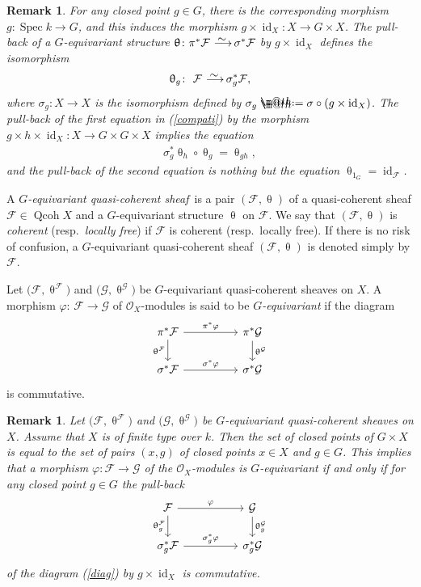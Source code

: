 \documentclass[11pt]{article}
\makeatletter
\numberwithin{equation}{section}
\newtheorem{rem}[dfn]{Remark}
\newcommand*{\defeq}{\mathrel{\rlap{%
 \raisebox{0.3ex}{$\m@th\cdot$}}%
 \raisebox{-0.3ex}{$\m@th\cdot$}}%
 =}
\numberwithin{equation}{section}
\newcommand{\Spec}{\operatorname{Spec}}
\newcommand{\Qcoh}{\operatorname{Qcoh}}
\newcommand{\id}{\operatorname{id}}
\newcommand{\cF}{\mathcal{F}}
\newcommand{\cG}{\mathcal{G}}
\newcommand{\cO}{\mathcal{O}}
\newcommand{\simto}{\,\,\,\,\raisebox{4pt}{$\sim$}{\kern -1.1em \longrightarrow}\,}
\makeatother
\begin{document}
\begin{rem}\label{closed point isom}
For any closed point $g\in G$, there is the corresponding morphism $g\colon \Spec k\to G$, and this induces the morphism $g\times\id_X\colon X\to G\times X$. The pull-back of a $G$-equivariant structure $\uptheta\colon \pi^*\cF\simto \sigma^*\cF$ by $g\times \id_X$ defines the isomorphism
\begin{gather*}
\uptheta_g\colon\ \cF\simto \sigma_g^*\cF,
\end{gather*}
where $\sigma_g\colon X\to X$ is the isomorphism defined by $\sigma_g\defeq \sigma\circ (g\times \id_X)$. The pull-back of the first equation in (\ref{compati}) by the morphism $ g\times h\times\id_X\colon X\to G\times G\times X$ implies the equation
\begin{gather*}
\sigma_g^*\uptheta_h\circ \uptheta_g=\uptheta_{gh},
\end{gather*}
and the pull-back of the second equation is nothing but the equation $\uptheta_{1_G}=\id_{\cF}$.
\end{rem}

A {\it $G$-equivariant quasi-coherent sheaf} \,is a pair $(\cF, \uptheta)$ of a quasi-coherent sheaf $\cF\in\Qcoh X$ and a $G$-equivariant structure $\uptheta$ on $\cF$. We say that $(\cF,\uptheta)$ is {\it coherent} (resp.\ {\it locally free}) if $\cF$ is coherent (resp.\ locally free). If there is no risk of confusion, a $G$-equivariant quasi-coherent sheaf $(\cF, \uptheta)$ is denoted simply by $\cF$.

Let $\big(\cF,\uptheta^{\cF}\big)$ and $\big(\cG,\uptheta^{\cG}\big)$ be $G$-equivariant quasi-coherent sheaves on $X$. A morphism $\varphi$: $\cF\to \cG$ of $\cO_X$-modules is said to be {\it $G$-equivariant} if the diagram
\begin{equation}\label{diag}
\begin{tikzcd}
\pi^*\cF\arrow[rr,"\pi^*\varphi"]\arrow[d,"\uptheta^{\cF}"']&&\pi^*\cG\arrow[d," \uptheta^{\cG}"]\\
\sigma^*\cF\arrow[rr, "\sigma^*\varphi"]&&\sigma^*\cG
\end{tikzcd}\end{equation}
is commutative.

\begin{rem}\label{cl pt}
Let $\big(\cF,\uptheta^{\cF}\big)$ and $\big(\cG,\uptheta^{\cG}\big)$ be $G$-equivariant quasi-coherent sheaves on $X$. Assume that $X$ is of finite type over $k$. Then the set of closed points of $G\times X$ is equal to the set of pairs $(x,g)$ of closed points $x\in X$ and $g\in G$. This implies that a morphism $\varphi\colon\cF\to \cG$ of the $\cO_X$-modules is $G$-equivariant if and only if for any closed point $g\in G$ the pull-back
\begin{equation*}
\begin{tikzcd}
\cF\arrow[rr,"\varphi"]\arrow[d,"\uptheta^{\cF}_g"']&&\cG\arrow[d," \uptheta^{\cG}_g"]\\
\sigma_g^*\cF\arrow[rr, "\sigma^*_g\varphi"]&&\sigma_g^*\cG
\end{tikzcd}
\end{equation*}
of the diagram (\ref{diag}) by $g\times\id_X $ is commutative.
\end{rem}
\end{document}
